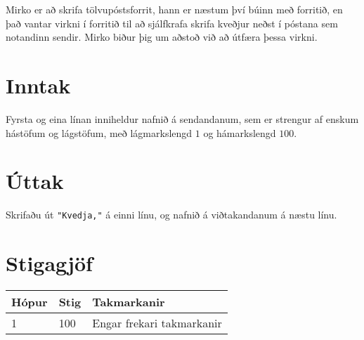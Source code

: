 Mirko er að skrifa tölvupóstsforrit, hann er næstum því búinn með forritið,
en það vantar virkni í forritið til að sjálfkrafa skrifa kveðjur neðst í póstana sem notandinn sendir.
Mirko biður þig um aðstoð við að útfæra þessa virkni.

\section*{Inntak}
Fyrsta og eina línan inniheldur nafnið á sendandanum, sem er strengur af enskum hástöfum og lágstöfum, með lágmarkslengd $1$ og hámarkslengd $100$.

\section*{Úttak}
Skrifaðu út \texttt{"Kvedja,"} á einni línu, og nafnið á viðtakandanum á næstu línu.

\section*{Stigagjöf}
\begin{tabular}{|l|l|l|}
\hline
Hópur & Stig & Takmarkanir \\ \hline
1     & 100  & Engar frekari takmarkanir \\ \hline
\end{tabular}

